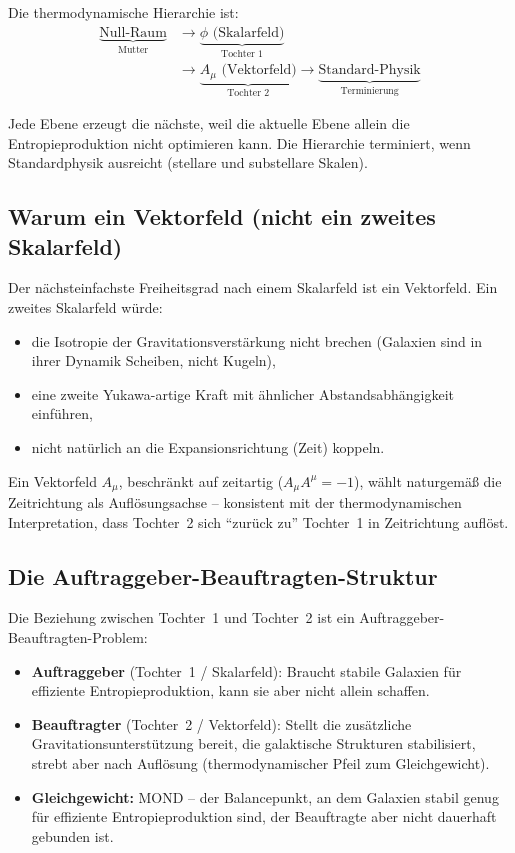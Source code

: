 \documentclass[aps,prd,twocolumn,superscriptaddress,nofootinbib]{revtex4-2}
\begin{document}
Die thermodynamische Hierarchie ist:
\begin{equation}
\begin{split}
\underbrace{\text{Null-Raum}}_{\text{Mutter}} &\to \underbrace{\phi \text{ (Skalarfeld)}}_{\text{Tochter 1}} \\
&\to \underbrace{A_\mu \text{ (Vektorfeld)}}_{\text{Tochter 2}} \to \underbrace{\text{Standard-Physik}}_{\text{Terminierung}}
\end{split}
\label{eq:hierarchy}
\end{equation}

Jede Ebene erzeugt die n\"achste, weil die aktuelle Ebene allein die Entropieproduktion nicht optimieren kann. Die Hierarchie terminiert, wenn Standardphysik ausreicht (stellare und substellare Skalen).

\subsection{Warum ein Vektorfeld (nicht ein zweites Skalarfeld)}
\label{sec:why_vector_not_scalar}

Der n\"achsteinfachste Freiheitsgrad nach einem Skalarfeld ist ein Vektorfeld. Ein zweites Skalarfeld w\"urde:
\begin{itemize}
\item die Isotropie der Gravitationsverst\"arkung nicht brechen (Galaxien sind in ihrer Dynamik Scheiben, nicht Kugeln),
\item eine zweite Yukawa-artige Kraft mit \"ahnlicher Abstandsabh\"angigkeit einf\"uhren,
\item nicht nat\"urlich an die Expansionsrichtung (Zeit) koppeln.
\end{itemize}

Ein Vektorfeld $A_\mu$, beschr\"ankt auf zeitartig ($A_\mu A^\mu = -1$), w\"ahlt naturgem\"a\ss{} die Zeitrichtung als Aufl\"osungsachse -- konsistent mit der thermodynamischen Interpretation, dass Tochter~2 sich ``zur\"uck zu'' Tochter~1 in Zeitrichtung aufl\"ost.

\subsection{Die Auftraggeber-Beauftragten-Struktur}
\label{sec:principal_agent}

Die Beziehung zwischen Tochter~1 und Tochter~2 ist ein Auftraggeber-Beauftragten-Problem:
\begin{itemize}
\item \textbf{Auftraggeber} (Tochter~1 / Skalarfeld): Braucht stabile Galaxien für effiziente Entropieproduktion, kann sie aber nicht allein schaffen.
\item \textbf{Beauftragter} (Tochter~2 / Vektorfeld): Stellt die zus\"atzliche Gravitationsunterst\"utzung bereit, die galaktische Strukturen stabilisiert, strebt aber nach Aufl\"osung (thermodynamischer Pfeil zum Gleichgewicht).
\item \textbf{Gleichgewicht:} MOND -- der Balancepunkt, an dem Galaxien stabil genug f\"ur effiziente Entropieproduktion sind, der Beauftragte aber nicht dauerhaft gebunden ist.
\end{itemize}
\end{document}
